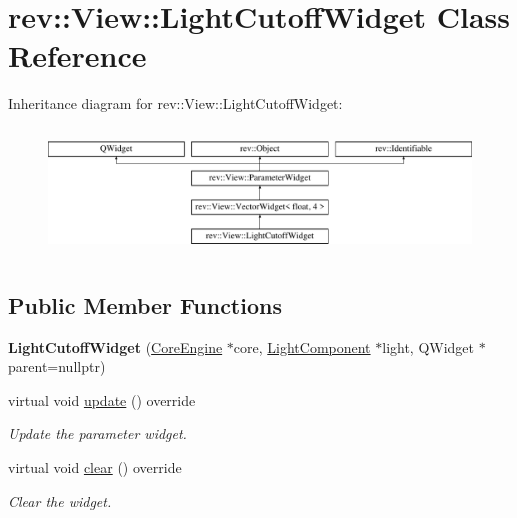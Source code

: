 \hypertarget{classrev_1_1_view_1_1_light_cutoff_widget}{}\section{rev\+::View\+::Light\+Cutoff\+Widget Class Reference}
\label{classrev_1_1_view_1_1_light_cutoff_widget}
Inheritance diagram for rev\+::View\+::Light\+Cutoff\+Widget\+:\begin{figure}[H]
\begin{center}
\leavevmode
\includegraphics[height=3.409437cm]{classrev_1_1_view_1_1_light_cutoff_widget}
\end{center}
\end{figure}
\subsection*{Public Member Functions}
\begin{DoxyCompactItemize}
\item 
\mbox{\label{classrev_1_1_view_1_1_light_cutoff_widget_a827eac1e546bc03aea3f473689634f13}} 
{\bfseries Light\+Cutoff\+Widget} (\mbox{\hyperlink{classrev_1_1_core_engine}{Core\+Engine}} $\ast$core, \mbox{\hyperlink{classrev_1_1_light_component}{Light\+Component}} $\ast$light, Q\+Widget $\ast$parent=nullptr)
\item 
\mbox{\label{classrev_1_1_view_1_1_light_cutoff_widget_ae2934445ce43d405bfa558792393e5f8}} 
virtual void \mbox{\hyperlink{classrev_1_1_view_1_1_light_cutoff_widget_ae2934445ce43d405bfa558792393e5f8}{update}} () override
\begin{DoxyCompactList}\small\item\em Update the parameter widget. \end{DoxyCompactList}\item 
\mbox{\label{classrev_1_1_view_1_1_light_cutoff_widget_ac093b8dee9d2f1abe0ae2b614f651608}} 
virtual void \mbox{\hyperlink{classrev_1_1_view_1_1_light_cutoff_widget_ac093b8dee9d2f1abe0ae2b614f651608}{clear}} () override
\begin{DoxyCompactList}\small\item\em Clear the widget. \end{DoxyCompactList}\end{DoxyCompactItemize}
